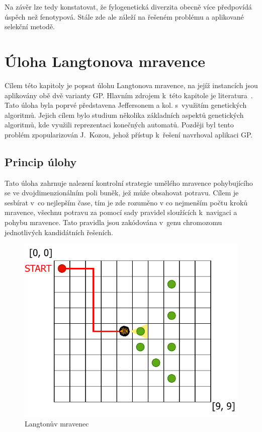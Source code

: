 Na závěr lze tedy konstatovat, že fylogenetická diverzita obecně více předpovídá úspěch než fenotypová. Stále zde ale záleží na řešeném problému a aplikované selekční metodě. 


\chapter{Úloha Langtonova mravence}\label{ch:5}

Cílem této kapitoly je popsat úlohu Langtonova mravence, na jejíž instancích jsou aplikovány obě dvě varianty GP. Hlavním zdrojem k~této kapitole je literatura~\cite{Brameier1998}. Tato úloha byla poprvé představena Jeffersonem a kol. s~využitím genetických algoritmů. Jejich cílem bylo studium několika základních aspektů genetických algoritmů, kde využili reprezentaci konečných automatů. Později byl tento problém zpopularizován J.~Kozou, jehož přístup k~řešení navrhoval aplikaci GP.   

\section{Princip úlohy}
Tato úloha zahrnuje nalezení kontrolní strategie umělého mravence pohybujícího se ve dvojdimenzionálním poli buněk, jež může obsahovat potravu. Cílem je sesbírat v~co nejlepším čase, tím je zde rozuměno v co nejmenším počtu kroků mravence, všechnu potravu za pomocí sady pravidel sloužících k~navigaci a pohybu mravence. Tato pravidla jsou zakódována v~genu chromozomu jednotlivých kandidátních řešeních. 

\begin{figure}[!h]
    \centering
    \includegraphics[scale=0.7]{obrazky-figures/langtonsant.pdf}
    \caption{Langtonův mravenec}
    \label{fig:langtons_ant}
\end{figure}

